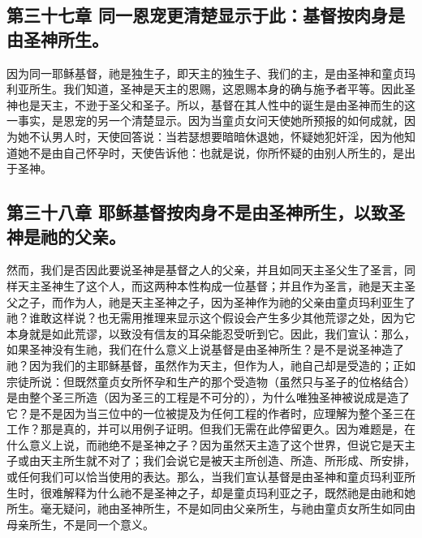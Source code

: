 
\subsection{第三十七章 同一恩宠更清楚显示于此：基督按肉身是由圣神所生。}

因为同一耶稣基督，祂是独生子，即天主的独生子、我们的主，是由圣神和童贞玛利亚所生。我们知道，圣神是天主的恩赐，这恩赐本身的确与施予者平等。因此圣神也是天主，不逊于圣父和圣子。所以，基督在其人性中的诞生是由圣神而生的这一事实，是恩宠的另一个清楚显示。因为当童贞女问天使她所预报的如何成就，因为她不认男人时，天使回答说：当若瑟想要暗暗休退她，怀疑她犯奸淫，因为他知道她不是由自己怀孕时，天使告诉他：也就是说，你所怀疑的由别人所生的，是出于圣神。\par


\subsection{第三十八章 耶稣基督按肉身不是由圣神所生，以致圣神是祂的父亲。}

然而，我们是否因此要说圣神是基督之人的父亲，并且如同天主圣父生了圣言，同样天主圣神生了这个人，而这两种本性构成一位基督；并且作为圣言，祂是天主圣父之子，而作为人，祂是天主圣神之子，因为圣神作为祂的父亲由童贞玛利亚生了祂？谁敢这样说？也无需用推理来显示这个假设会产生多少其他荒谬之处，因为它本身就是如此荒谬，以致没有信友的耳朵能忍受听到它。因此，我们宣认：那么，如果圣神没有生祂，我们在什么意义上说基督是由圣神所生？是不是说圣神造了祂？因为我们的主耶稣基督，虽然作为天主，但作为人，祂自己却是受造的；正如宗徒所说：但既然童贞女所怀孕和生产的那个受造物（虽然只与圣子的位格结合）是由整个圣三所造（因为圣三的工程是不可分的），为什么唯独圣神被说成是造了它？是不是因为当三位中的一位被提及为任何工程的作者时，应理解为整个圣三在工作？那是真的，并可以用例子证明。但我们无需在此停留更久。因为难题是，在什么意义上说，而祂绝不是圣神之子？因为虽然天主造了这个世界，但说它是天主子或由天主所生就不对了；我们会说它是被天主所创造、所造、所形成、所安排，或任何我们可以恰当使用的表达。那么，当我们宣认基督是由圣神和童贞玛利亚所生时，很难解释为什么祂不是圣神之子，却是童贞玛利亚之子，既然祂是由祂和她所生。毫无疑问，祂由圣神所生，不是如同由父亲所生，与祂由童贞女所生如同由母亲所生，不是同一个意义。\par


